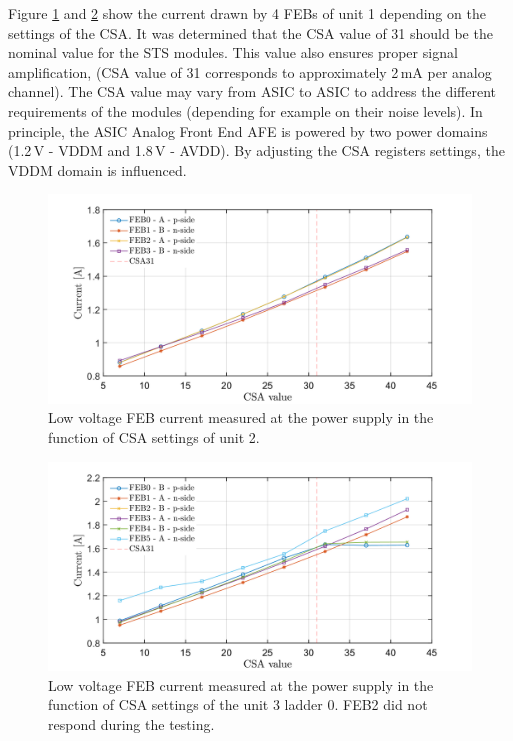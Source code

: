 \newpage
Figure \ref{fig_power3} and \ref{fig_power4} show the current drawn by 4 \glspl{FEB} of unit 1 depending on the settings of the \gls{CSA}. It was determined that the \gls{CSA} value of 31 should be the nominal value for the \gls{STS} modules. This value also ensures proper signal amplification, (\gls{CSA} value of 31 corresponds to approximately 2\,mA per analog channel). The \gls{CSA} value may vary from \gls{ASIC} to \gls{ASIC} to address the different requirements of the modules (depending for example on their noise levels). In principle, the \gls{ASIC} Analog Front End \gls{AFE} is powered by two power domains (1.2\,V - VDDM and 1.8\,V - AVDD). By adjusting the \gls{CSA} registers settings, the VDDM domain is influenced. 
\begin{figure}[h!]
\centering
\includegraphics[width=0.9\columnwidth]{Chapter6/DCS/images/U0CSABIAS.png}
\caption{Low voltage \gls{FEB} current measured at the power supply in the function of CSA settings of unit 2. }
\label{fig_power3}
\end{figure}
\begin{figure}[h!]
\centering
\includegraphics[width=0.9\columnwidth]{Chapter6/DCS/images/U3L0CSABIAS.png}
\caption{Low voltage \gls{FEB} current measured at the power supply in the function of CSA settings of the unit 3 ladder 0. FEB2 did not respond during the testing.}
\label{fig_power4}
\end{figure}

